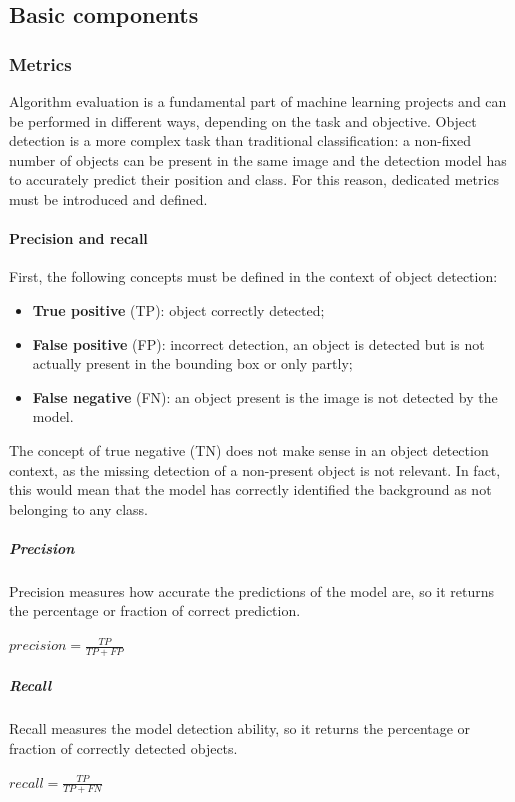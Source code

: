 \documentclass[%
    corpo=12pt,
    twoside,
    stile=classica,   
    tipotesi=magistrale,
    evenboxes,
    english
]{toptesi}
\begin{document}
\subsection{Basic components}
\subsubsection{Metrics}
Algorithm evaluation is a fundamental part of machine learning projects and can be performed in different ways, depending on the task and objective. Object detection is a more complex task than traditional classification: a non-fixed number of objects can be present in the same image and the detection model has to accurately predict their position and class. For this reason, dedicated metrics must be introduced and defined.

\paragraph{Precision and recall}
First, the following concepts must be defined in the context of object detection:
\begin{itemize}
	\item \textbf{True positive} (TP): object correctly detected;
	\item \textbf{False positive} (FP): incorrect detection, an object is detected but is not actually present in the bounding box or only partly;
	\item \textbf{False negative} (FN): an object present is the image is not detected by the model.
\end{itemize}
The concept of true negative (TN) does not make sense in an object detection context, as the missing detection of a non-present object is not relevant. In fact, this would mean that the model has correctly identified the background as not belonging to any class.

\subparagraph{Precision}
Precision measures how accurate the predictions of the model are, so it returns the percentage or fraction of correct prediction.
\begin{center}
	$precision = \frac{TP}{TP+FP}$
\end{center}

\subparagraph{Recall}
Recall measures the model detection ability, so it returns the percentage or fraction of correctly detected objects.
\begin{center}
	$recall = \frac{TP}{TP+FN}$
\end{center}
\end{document}
